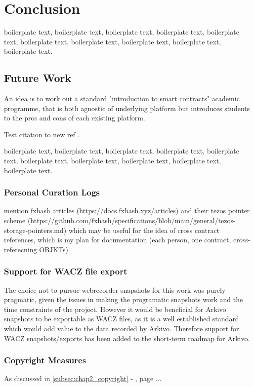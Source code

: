 \chapter{Conclusion}


boilerplate text, boilerplate text, boilerplate text, boilerplate text, boilerplate text, boilerplate text, boilerplate text, boilerplate text, boilerplate text, boilerplate text.


\section{Future Work}


An idea is to work out a standard "introduction to smart contracts" academic programme, that is both agnostic of underlying platform but introduces students to the pros and cons of each existing platform.

Test citation to new ref  \cite{dekkerCollectingConservingNet2018}.

boilerplate text, boilerplate text, boilerplate text, boilerplate text, boilerplate text, boilerplate text, boilerplate text, boilerplate text, boilerplate text, boilerplate text.


\subsection{Personal Curation Logs}

mention fxhash articles (https://docs.fxhash.xyz/articles) and their tezos pointer scheme (https://github.com/fxhash/specifications/blob/main/general/tezos-storage-pointers.md) which may be useful for the idea of cross contract references, which is my plan for documentation (each person, one contract, cross-referecning OBJKTs)

\subsection{Support for WACZ file export}

The choice not to pursue webrecorder snapshots for this work was purely pragmatic, given the issues in making the programatic snapshots work and the time constraints of the project. However it would be beneficial for Arkivo snapshots to be exportable as WACZ files, as it is a well established standard which would add value to the data recorded by Arkivo. Therefore support for WACZ snapshots/exports has been added to the short-term roadmap for Arkivo.


\subsection{Copyright Measures}


As discussed in \autoref{subsec:chap2_copyright} -  , page \pageref{subsec:chap2_copyright}... 